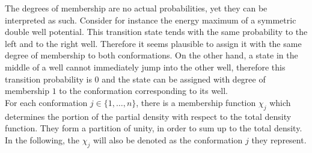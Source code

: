 The degrees of membership are no actual probabilities, yet they can be interpreted as such.
Consider for instance the energy maximum of a symmetric double well potential. This transition state tends with the same probability to the left and to the right well. Therefore it seems plausible to assign it with the same degree of membership to both conformations.
On the other hand, a state in the middle of a well cannot immediately jump into the other well, therefore this transition probability is $0$ and the state can be assigned with degree of membership $1$ to the conformation corresponding to its well.
\\


For each conformation $j \in \{ 1 , \dots, n \}$, there is a membership function $\chi_j$ which determines the portion of the partial density with respect to the total density function. 
They form a partition of unity, in order to sum up to the total density.
In the following, the $\chi_j$ will also be denoted as the conformation $j$ they represent.
\\

